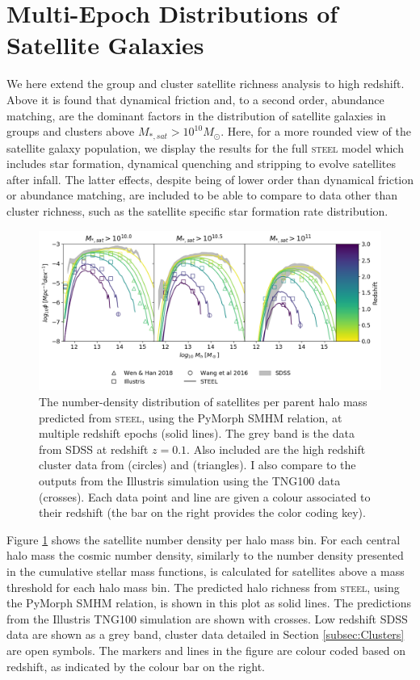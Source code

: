 \section{Multi-Epoch Distributions of Satellite Galaxies}

We here extend the group and cluster satellite richness analysis to high redshift. Above it is found that dynamical friction and, to a second order, abundance matching, are the dominant factors in the distribution of satellite galaxies in groups and clusters above $M_{*,sat} > 10^{10} M_{\odot}$. Here, for a more rounded view of the satellite galaxy population, we display the results for the full \textsc{steel} model which includes star formation, dynamical quenching and stripping to evolve satellites after infall. The latter effects, despite being of lower order than dynamical friction or abundance matching, are included to be able to compare to data other than cluster richness, such as the satellite specific star formation rate distribution.

\begin{figure}[h]
	\centering
	\includegraphics[width = \linewidth]{Figures/Chapter3/HighzClusters.png}
    \caption{The number-density distribution of satellites per parent halo mass predicted from \textsc{steel}, using the PyMorph SMHM relation, at multiple redshift epochs (solid lines). The grey band is the data from SDSS at redshift $z=0.1$. Also included are the high redshift cluster data from \citet{Wang2016DiscoveryZ=2.506} (circles) and \citet{Wen2018ARedshifts} (triangles). I also compare to the outputs from the Illustris simulation using the TNG100 data (crosses). Each data point and line are given a colour associated to their redshift (the bar on the right provides the color coding key).}
	\label{fig:Sat_Dist_High_z}
\end{figure}

Figure \ref{fig:Sat_Dist_High_z} shows the satellite number density per halo mass bin. For each central halo mass the cosmic number density, similarly to the number density presented in the cumulative stellar mass functions, is calculated for satellites above a mass threshold for each halo mass bin.
The predicted halo richness from \textsc{steel}, using the PyMorph SMHM relation, is shown in this plot as solid lines. The predictions from the Illustris TNG100 simulation \citep{Nelson2018FirstBimodality, Springel2018FirstClustering} are shown with crosses.  Low redshift SDSS data are shown as a grey band, cluster data detailed in Section \ref{subsec:Clusters} are open symbols. The markers and lines in the figure are colour coded based on redshift, as indicated by the colour bar on the right.

